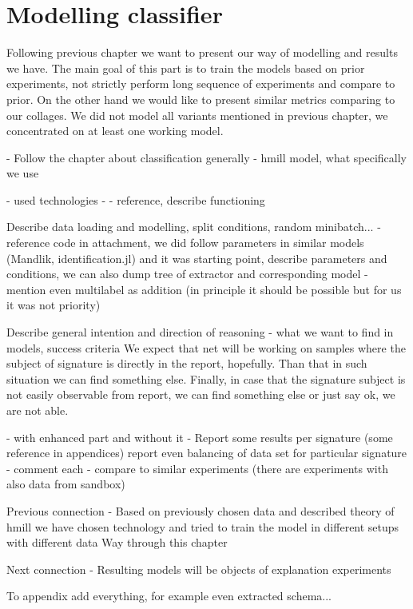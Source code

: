 \chapter{Modelling classifier}
Following previous chapter we want to present our way of modelling and results we have. The main goal of this part is to train the models based on prior experiments, not strictly perform long sequence of experiments and compare to prior. On the other hand we would like to present similar metrics comparing to our collages. We did not model all variants mentioned in previous chapter, we concentrated on at least one working model. 

- Follow the chapter about classification generally - hmill model, what specifically we use

- used technologies
  - 
  - reference, describe functioning

Describe data loading and modelling, split conditions, random minibatch... - reference code in attachment, we did follow parameters in similar models (Mandlik, identification.jl) and it was starting point, describe parameters and conditions, we can also dump tree of extractor and corresponding model
  - mention even multilabel as addition (in principle it should be possible but for us it was not priority)

Describe general intention and direction of reasoning - what we want to find in models, success criteria
We expect that net will be working on samples where the subject of signature is directly in the report, hopefully. Than that in such situation we can find something else. Finally, in case that the signature subject is not easily observable from report, we can find something else or just say ok, we are not able.

- with enhanced part and without it
  - Report some results per signature (some reference in appendices) report even balancing of data set for particular signature
  - comment each
  - compare to similar experiments (there are experiments with also data from sandbox)



Previous connection
- Based on previously chosen data and described theory of hmill we have chosen technology and tried to train the model in different setups with different data
Way through this chapter

Next connection
- Resulting models will be objects of explanation experiments

To appendix add everything, for example even extracted schema...



